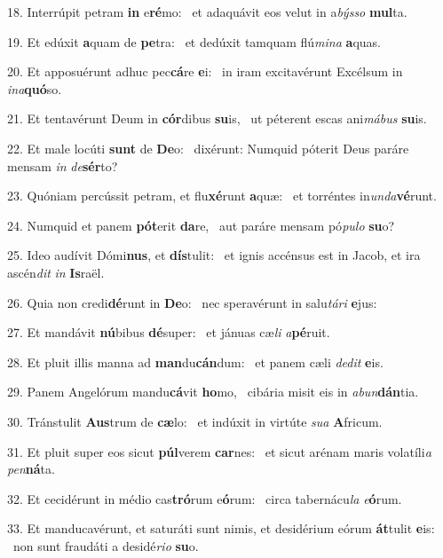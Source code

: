 18. Interrúpit petram \textbf{in} e\textbf{ré}mo: \ast\  et adaquávit eos velut in a\textit{býs}\textit{so} \textbf{mul}ta.\

19. Et edúxit \textbf{a}quam de \textbf{pe}tra: \ast\  et dedúxit tamquam flú\textit{mi}\textit{na} \textbf{a}quas.\

20. Et apposuérunt adhuc pec\textbf{cá}re \textbf{e}i: \ast\  in iram excitavérunt Excélsum in \textit{in}\textit{a}\textbf{quó}so.\

21. Et tentavérunt Deum in \textbf{cór}dibus \textbf{su}is, \ast\  ut péterent escas ani\textit{má}\textit{bus} \textbf{su}is.\

22. Et male locúti \textbf{sunt} de \textbf{De}o: \ast\  dixérunt: Numquid póterit Deus paráre mensam \textit{in} \textit{de}\textbf{sér}to?\

23. Quóniam percússit petram, et flu\textbf{xé}runt \textbf{a}quæ: \ast\  et torréntes in\textit{un}\textit{da}\textbf{vé}runt.\

24. Numquid et panem \textbf{pót}erit \textbf{da}re, \ast\  aut paráre mensam pó\textit{pu}\textit{lo} \textbf{su}o?\

25. Ideo audívit Dómi\textbf{nus}, et \textbf{dís}tulit: \ast\  et ignis accénsus est in Jacob, et ira ascén\textit{dit} \textit{in} \textbf{Is}raël.\

26. Quia non credi\textbf{dé}runt in \textbf{De}o: \ast\  nec speravérunt in salu\textit{tá}\textit{ri} \textbf{e}jus:\

27. Et mandávit \textbf{nú}bibus \textbf{dé}super: \ast\  et jánuas cæ\textit{li} \textit{a}\textbf{pé}ruit.\

28. Et pluit illis manna ad \textbf{man}du\textbf{cán}dum: \ast\  et panem cæli \textit{de}\textit{dit} \textbf{e}is.\

29. Panem Angelórum mandu\textbf{cá}vit \textbf{ho}mo, \ast\  cibária misit eis in \textit{ab}\textit{un}\textbf{dán}tia.\

30. Tránstulit \textbf{Aus}trum de \textbf{cæ}lo: \ast\  et indúxit in virtúte \textit{su}\textit{a} \textbf{A}fricum.\

31. Et pluit super eos sicut \textbf{púl}verem \textbf{car}nes: \ast\  et sicut arénam maris volatíli\textit{a} \textit{pen}\textbf{ná}ta.\

32. Et cecidérunt in médio cas\textbf{tró}rum e\textbf{ó}rum: \ast\  circa tabernácu\textit{la} \textit{e}\textbf{ó}rum.\

33. Et manducavérunt, et saturáti sunt nimis, et desidérium eórum \textbf{át}tulit \textbf{e}is: \ast\  non sunt fraudáti a desidé\textit{ri}\textit{o} \textbf{su}o.\


